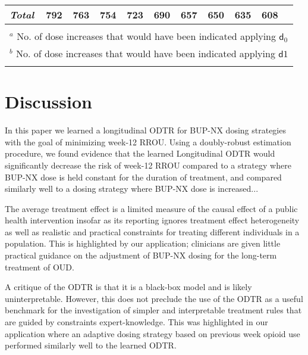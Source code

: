 \documentclass[11pt]{article}
\renewcommand{\d}{\mathsf{d}}
\begin{document}
\begin{table}[H]
\begin{tabular}[t]{lrrrrrrrrr|c}
\hspace{1em}\emph{Total} & 792 & 763 & 754 & 723 & 690 & 657 & 650 & 635 & 608\\
\bottomrule \\
\multicolumn{11}{l}{\footnotesize{$^a$ No. of dose increases that would have been indicated applying $\d_0$}}\\
\multicolumn{11}{l}{\footnotesize{$^b$ No. of dose increases that would have been indicated applying $\d1$}}\\
\label{tab:t1}
\end{tabular}
\end{table}

\section{Discussion}

In this paper we learned a longitudinal ODTR for BUP-NX dosing strategies with the goal of minimizing week-12 RROU. Using a doubly-robust estimation procedure, we found evidence that the learned Longitudinal ODTR would significantly decrease the risk of week-12 RROU compared to a strategy where BUP-NX dose is held constant for the duration of treatment, and compared similarly well to a dosing strategy where BUP-NX dose is increased...

The average treatment effect is a limited measure of the causal effect of a public health intervention insofar as its reporting ignores treatment effect heterogeneity as well as realistic and practical constraints for treating different individuals in a population. This is highlighted by our application; clinicians are given little practical guidance on the adjustment of BUP-NX dosing for the long-term treatment of OUD. 

A critique of the ODTR is that it is a black-box model and is likely uninterpretable. However, this does not preclude the use of the ODTR as a useful benchmark for the investigation of simpler and interpretable treatment rules that are guided by constraints expert-knowledge. This was highlighted in our application where an adaptive dosing strategy based on previous week opioid use performed similarly well to the learned ODTR. 

\newpage
\renewcommand{\refname}{References}



\end{document}
